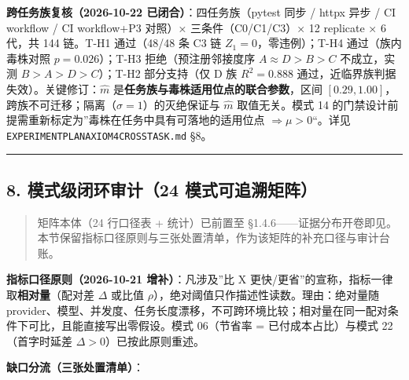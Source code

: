 \documentclass[
]{ctexart}
\renewcommand{\_}{\discretionary{}{}{\textunderscore}}
\begin{document}
\textbf{跨任务族复核（2026-10-22 已闭合）}：四任务族（pytest 同步 /
httpx 异步 / CI workflow / CI workflow+P3 对照）× 三条件（C0/C1/C3）× 12
replicate × 6 代，共 144 链。T-H1 通过（48/48 条 C3 链
\(Z_1=0\)，零违例）；T-H4 通过（族内毒株对照 \(p=0.026\)）；T-H3
拒绝（预注册邻接度序 \(A\approx D>B>C\) 不成立，实测 \(B>A>D>C\)）；T-H2
部分支持（仅 D 族 \(R^2=0.888\)
通过，近临界族判据失效）。关键修订：\(\hat m\)
是\textbf{任务族与毒株适用位点的联合参数}，区间
\([0.29,1.00]\)，跨族不可迁移；隔离（\(\sigma=1\)）的灭绝保证与
\(\hat m\) 取值无关。模式 14
的门禁设计前提需重新标定为''毒株在任务中具有可落地的适用位点
\(\Rightarrow \mu>0\)``。详见
\texttt{EXPERIMENT\_PLAN\_AXIOM4\_CROSS\_TASK.md} §8。

\begin{center}\rule{0.5\linewidth}{0.5pt}\end{center}

\subsection{8. 模式级闭环审计（24
模式可追溯矩阵）}\label{ux6a21ux5f0fux7ea7ux95edux73afux5ba1ux8ba124-ux6a21ux5f0fux53efux8ffdux6eafux77e9ux9635}

\begin{quote}
矩阵本体（24 行口径表 + 统计）已前置至
§1.4.6------证据分布开卷即见。本节保留指标口径原则与三张处置清单，作为该矩阵的补充口径与审计台账。
\end{quote}

\textbf{指标口径原则（2026-10-21 增补）}：凡涉及''比 X
更快/更省''的宣称，指标一律取\textbf{相对量}（配对差 \(\Delta\) 或比值
\(\rho\)），绝对阈值只作描述性读数。理由：绝对量随
provider、模型、并发度、任务长度漂移，不可跨环境比较；相对量在同一配对条件下可比，且能直接写出零假设。模式
06（节省率 = 已付成本占比）与模式 22（首字时延差
\(\Delta>0\)）已按此原则重述。

\textbf{缺口分流（三张处置清单）}：
\end{document}
